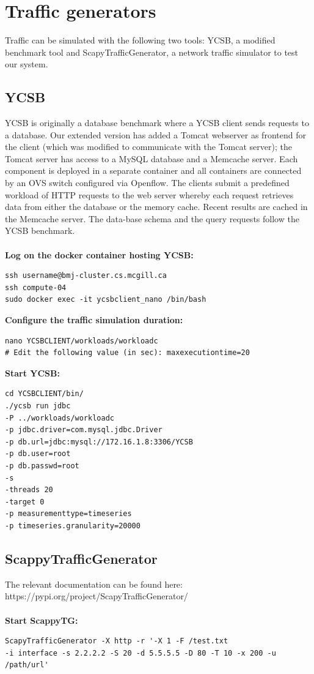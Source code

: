 \documentclass[12pt,hidelinks]{article}
\begin{document}
\newpage
\section{Traffic generators}	
\vspace{10.5cm}	
Traffic can be simulated with the following two tools: YCSB, a modified benchmark tool and ScapyTrafficGenerator, a network traffic simulator to test our system.

	\subsection{YCSB}
	
	YCSB is originally a database benchmark where a YCSB client sends requests to a database. Our extended version has added a Tomcat webserver as frontend for the client (which was modified to communicate with the Tomcat server); the Tomcat server has access to a MySQL database and a Memcache server. Each component is deployed in a separate container and all containers are connected by an OVS switch configured via Openflow. The clients submit a predefined workload of HTTP requests to the web server whereby each request retrieves data from either the database or the memory cache. Recent results are cached in the Memcache server. The data-base schema and the query requests follow the YCSB benchmark. \\
\\
\textbf{Log on the docker container hosting YCSB:}
\begin{verbatim}
ssh username@bmj-cluster.cs.mcgill.ca
ssh compute-04
sudo docker exec -it ycsbclient_nano /bin/bash
\end{verbatim}

\pagebreak


\textbf{Configure the traffic simulation duration:}
\begin{verbatim}
nano YCSBCLIENT/workloads/workloadc
# Edit the following value (in sec): maxexecutiontime=20
\end{verbatim}
	
\textbf{Start YCSB:}
\begin{verbatim}
cd YCSBCLIENT/bin/
./ycsb run jdbc 
-P ../workloads/workloadc 
-p jdbc.driver=com.mysql.jdbc.Driver
-p db.url=jdbc:mysql://172.16.1.8:3306/YCSB 
-p db.user=root 
-p db.passwd=root 
-s 
-threads 20 
-target 0 
-p measurementtype=timeseries 
-p timeseries.granularity=20000
\end{verbatim}
   	\subsection{ScappyTrafficGenerator}\label{subsec:mathenvironments}
The relevant documentation can be found here: https://pypi.org/project/ScapyTrafficGenerator/ \\
\\
\textbf{Start ScappyTG:} 
\begin{verbatim}
ScapyTrafficGenerator -X http -r '-X 1 -F /test.txt 
-i interface -s 2.2.2.2 -S 20 -d 5.5.5.5 -D 80 -T 10 -x 200 -u /path/url'
\end{verbatim}
\newpage
\end{document}
